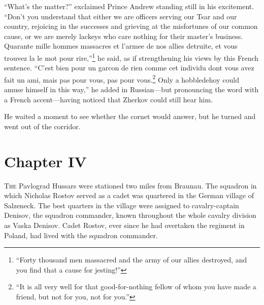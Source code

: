 ``What's the matter?'' exclaimed Prince Andrew standing still in
his excitement. ``Don't you understand that either we are
officers serving our Tsar and our country, rejoicing in the
successes and grieving at the misfortunes of our common cause, or
we are merely lackeys who care nothing for their master's
business. Quarante mille hommes massacres et l'armee de nos
allies detruite, et vous trouvez la le mot pour
rire,''\footnote{``Forty thousand men massacred and the army of
our allies destroyed, and you find that a cause for jesting!''}
he said, as if strengthening his views by this French
sentence. ``C'est bien pour un garcon de rien comme cet individu
dont vous avez fait un ami, mais pas pour vous, pas pour
vous.\footnote{``It is all very well for that good-for-nothing
fellow of whom you have made a friend, but not for you, not for
you.''} Only a hobbledehoy could amuse himself in this way,'' he
added in Russian---but pronouncing the word with a French
accent---having noticed that Zherkov could still hear him.

He waited a moment to see whether the cornet would answer, but he
turned and went out of the corridor.


\chapter*{Chapter IV}
\ifaudio     {} \fi

\lettrine[lines=2, loversize=0.3, lraise=0]{\initfamily T}{he}
Pavlograd Hussars were stationed two miles from Braunau. The
squadron in which Nicholas Rostov served as a cadet was quartered
in the German village of Salzeneck. The best quarters in the
village were assigned to cavalry-captain Denisov, the squadron
commander, known throughout the whole cavalry division as Vaska
Denisov. Cadet Rostov, ever since he had overtaken the regiment
in Poland, had lived with the squadron commander.

